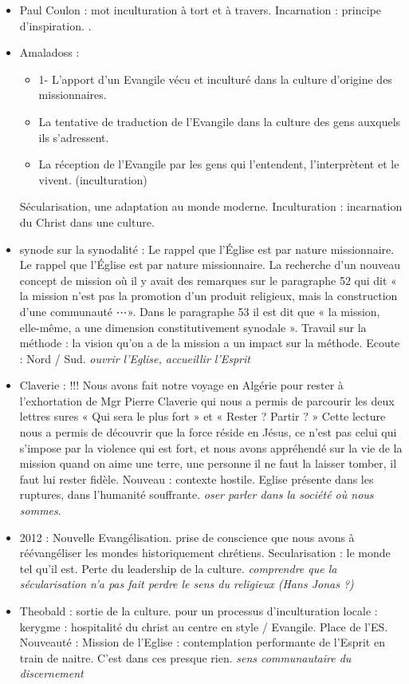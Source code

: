 \begin{itemize}
\item Paul Coulon : mot inculturation à tort et à travers. Incarnation  : principe d'inspiration. . 
\item Amaladoss  : \begin{itemize}
    \item 1- L’apport d’un Evangile vécu et inculturé dans la culture d’origine des missionnaires.
    \item La tentative de traduction de l’Evangile dans la culture des gens auxquels ils
s’adressent.
    \item La réception de l’Evangile par les gens qui l’entendent, l’interprètent et le vivent. (inculturation)
\end{itemize}
Sécularisation, une adaptation au monde moderne. Inculturation : incarnation du Christ dans une culture. 

\item synode sur la synodalité : Le rappel que l’Église est par nature missionnaire. Le rappel que l’Église est par nature missionnaire. La recherche d’un nouveau
concept de mission où il y avait des remarques sur le paragraphe 52 qui dit « la mission
n’est pas la promotion d’un produit religieux, mais la construction d’une communauté
⋯». Dans le paragraphe 53 il est dit que « la mission, elle-même, a une dimension
constitutivement synodale ». Travail sur la méthode : la vision qu'on a de la mission a un impact sur la méthode. Ecoute : Nord / Sud.  \textit{ouvrir l'Eglise, accueillir l'Esprit}

\item Claverie : !!! Nous avons fait notre voyage
en Algérie pour rester à l’exhortation de Mgr Pierre Claverie qui nous a permis de parcourir les deux lettres sures « Qui sera le plus fort » et « Rester ? Partir ? » Cette lecture nous a permis de découvrir que la force réside en Jésus, ce n’est pas celui qui
s’impose par la violence qui est fort, et nous avons appréhendé sur la vie de la mission quand on aime une terre, une personne il ne faut la laisser tomber, il faut lui rester fidèle. Nouveau : contexte hostile. Eglise présente dans les ruptures, dans l'humanité souffrante. \textit{oser parler dans la société où nous sommes}.


\item 2012 : Nouvelle Evangélisation. prise de conscience que nous avons à réévangéliser les mondes historiquement chrétiens. Secularisation : le monde tel qu'il est. Perte du leadership de la culture. \textit{comprendre que la sécularisation n'a pas fait perdre le sens du religieux (Hans Jonas ?) }


\item Theobald : sortie de la culture. pour un processus d'inculturation locale : kerygme : hospitalité du christ au centre en style / Evangile. Place de l'ES. Nouveauté : Mission de l'Eglise : contemplation performante de l'Esprit en train de naitre. C'est dans ces presque rien. \textit{sens communautaire du discernement}
\end{itemize}


